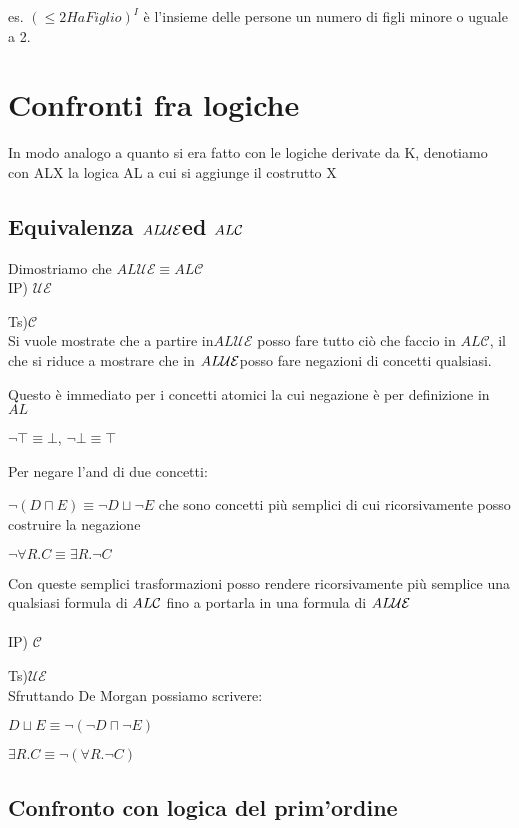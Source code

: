 es. $(\leq2HaFiglio)^{I}$ è l'insieme delle persone un numero di
figli minore o uguale a 2.


\section{Confronti fra logiche }

In modo analogo a quanto si era fatto con le logiche derivate da K,
denotiamo con ALX la logica AL a cui si aggiunge il costrutto X


\subsection{Equivalenza $AL\mbox{\ensuremath{\mathcal{UE}}}$ed $AL\mbox{\ensuremath{\mathcal{\mathcal{C}}}}$}

Dimostriamo che $AL\mathcal{UE}\equiv AL\mathcal{C}$\\


IP) $\mathcal{UE}$

Ts)$\mathcal{C}$\\


Si vuole mostrate che a partire in$AL\mathcal{UE}$ posso fare tutto
ciò che faccio in $AL\mathcal{C}$, il che si riduce a mostrare che
in $AL\mbox{\ensuremath{\mathcal{UE}}}$posso fare negazioni di concetti qualsiasi.

Questo è immediato per i concetti atomici la cui negazione è per definizione
in $AL$

$\neg\top\equiv\bot$, $\neg\bot\equiv\top$

Per negare l'and di due concetti:

$\neg(D\sqcap E)\equiv\neg D\sqcup\neg E$ che sono concetti più semplici
di cui ricorsivamente posso costruire la negazione

$\neg\forall R.C\equiv\exists R.\neg C$

Con queste semplici trasformazioni posso rendere ricorsivamente più
semplice una qualsiasi formula di $AL\mbox{\ensuremath{\mathcal{\mathcal{C}}}}$ fino a portarla in una formula
di $AL\mbox{\ensuremath{\mathcal{UE}}}$\\
\\
IP) $\mathcal{C}$

Ts)$\mathcal{UE}$\\


Sfruttando De Morgan possiamo scrivere:

$D\sqcup E\equiv\neg(\neg D\sqcap\neg E)$

$\exists R.C\equiv\neg(\forall R.\neg C)$


\subsection{Confronto con logica del prim'ordine}

